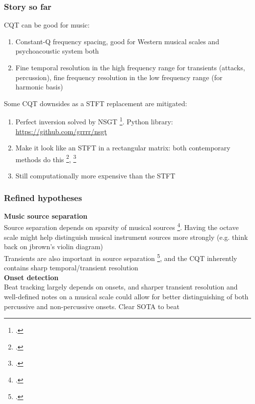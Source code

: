 \documentclass[usenames,dvipsnames]{beamer}
\begin{document}
\begin{frame}
	\frametitle{Story so far}
	CQT can be good for music:
	\begin{enumerate}
		\item
			Constant-Q frequency spacing, good for Western musical scales and psychoacoustic system both
		\item
			Fine temporal resolution in the high frequency range for transients (attacks, percussion), fine frequency resolution in the low frequency range (for harmonic basis)
	\end{enumerate}
	Some CQT downsides as a STFT replacement are mitigated:
	\begin{enumerate}
		\item
			Perfect inversion solved by NSGT \footcite{invertiblecqt}. Python library: \href{https://github.com/grrrr/nsgt}{https://github.com/grrrr/nsgt}
		\item
			Make it look like an STFT in a rectangular matrix: both contemporary methods do this \footcite{cqtklapuri}, \footcite{invertiblecqt}
		\item
			Still computationally more expensive than the STFT
	\end{enumerate}
\end{frame}

\begin{frame}
	\frametitle{Refined hypotheses}
	\textbf{Music source separation}\\
	Source separation depends on sparsity of musical sources \footcite{musicsepgood}. Having the octave scale might help distinguish musical instrument sources more strongly (e.g. think back on jbrown's violin diagram)\\
	Transients are also important in source separation \footcite{transientsep}, and the CQT inherently contains sharp temporal/transient resolution\\
	\vspace{1em}
	\textbf{Onset detection}\\
	Beat tracking largely depends on onsets, and sharper transient resolution and well-defined notes on a musical scale could allow for better distinguishing of both percussive and non-percussive onsets. Clear SOTA to beat
\end{frame}
\end{document}
